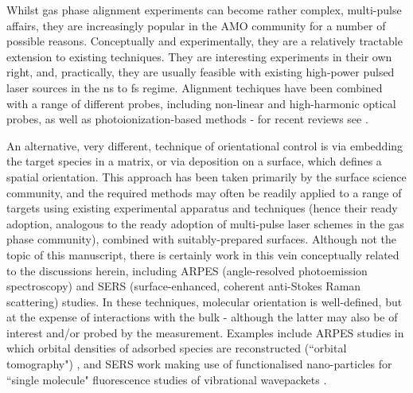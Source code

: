 Whilst gas phase alignment experiments can become rather complex, multi-pulse affairs, they are increasingly popular in the AMO community for a number of possible reasons. Conceptually and experimentally, they are a relatively tractable extension to existing techniques. They are interesting experiments in their own right, and, practically, they are usually feasible with existing high-power pulsed laser sources in the ns to fs regime. Alignment techiques have been combined with a range of different probes, including non-linear and high-harmonic optical probes, as well as photoionization-based methods - for recent reviews see \cite{hasegawa2015NonadiabaticMolecularAlignment,koch2019QuantumControlMolecular}. 

An alternative, very different, technique of orientational control is via embedding the target species in a matrix, or via deposition on a surface, which defines a spatial orientation. This approach has been taken primarily by the surface science community, and the required methods may often be readily applied to a range of targets using existing experimental apparatus and techniques (hence their ready adoption, analogous to the ready adoption of multi-pulse laser schemes in the gas phase community), combined with suitably-prepared surfaces. Although not the topic of this manuscript, there is certainly work in this vein conceptually related to the discussions herein, including ARPES (angle-resolved photoemission spectroscopy) and SERS (surface-enhanced, coherent anti-Stokes Raman scattering) studies. In these techniques, molecular orientation is well-defined, but at the expense of interactions with the bulk - although the latter may also be of interest and/or probed by the measurement. 
Examples include ARPES studies in which orbital densities of adsorbed species are reconstructed (``orbital tomography") \cite{Puschnig2009a,dauth2014AngleResolvedPhotoemission}, and SERS work making use of functionalised nano-particles for ``single molecule" fluorescence studies of vibrational wavepackets \cite{Yampolsky2014}. 



